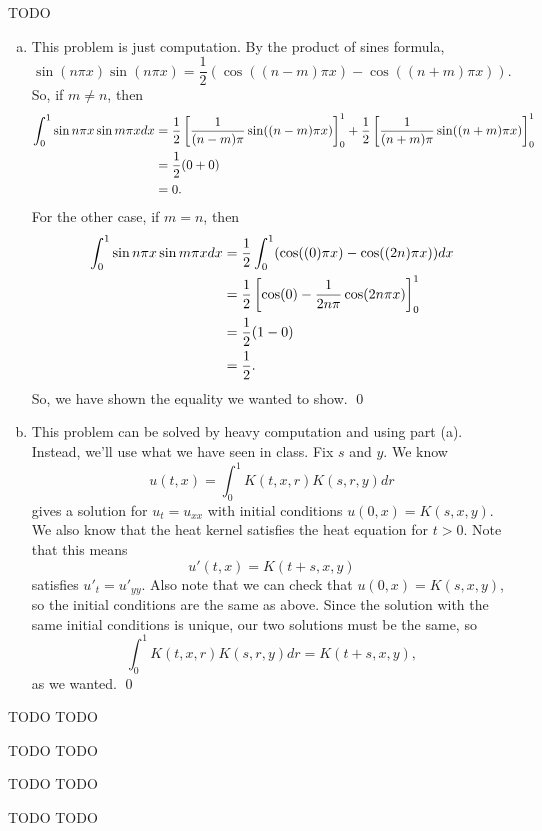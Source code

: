 \documentclass{article}
\begin{document}
\newpage
{} TODO \tri
\hop
\solution
\begin{enumerate}[(a)]
    \item This problem is just computation. By the product of sines formula, 
    \[\sin(n\pi x)\sin(n\pi x) = \frac{1}{2}(\cos((n-m)\pi x) - \cos((n+m)\pi x)).\]
    So, if $m \ne n$, then 
    \begin{align*}
        \int_0^1 \sin n\pi x \sin m \pi x dx&= \frac{1}{2}\sbr{\frac{1}{(n-m)\pi}\sin((n-m)\pi x)}_0^1+\frac{1}{2}\sbr{\frac{1}{(n+m)\pi}\sin((n+m)\pi x)}_0^1\\
        &= \frac{1}{2}(0+0)\\
        &= 0.
    \end{align*}
    For the other case, if $m = n$, then
    \begin{align*}
        \int_0^1 \sin n\pi x \sin m \pi x dx&=  \frac{1}{2}\int_0^1(\cos((0)\pi x) - \cos((2n)\pi x)) dx \\
        &= \frac{1}{2}\sbr{\cos(0) - \frac{1}{2n\pi}\cos(2n\pi x)}_0^1 \\
        &= \frac{1}{2}(1-0) \\
        &= \frac{1}{2}.
    \end{align*}
    So, we have shown the equality we wanted to show. \qed
    \item This problem can be solved by heavy computation and using part (a). Instead, we'll use what we have seen in class. Fix $s$ and $y$. We know 
    \[u(t,x)=\int_0^1K(t,x,r)K(s,r,y)dr\]
    gives a solution for $u_t = u_{xx}$ with initial conditions $u(0,x) = K(s,x,y)$. We also know that the heat kernel satisfies the heat equation for $t>0$. Note that this means
    \[u'(t,x) = K(t+s, x, y)\]
    satisfies $u'_t = u'_{yy}$. Also note that we can check that $u(0,x) = K(s,x,y)$, so the initial conditions are the same as above. Since the solution with the same initial conditions is unique, our two solutions must be the same, so 
    \[\int_0^1K(t,x,r)K(s,r,y)dr=K(t+s, x, y),\]
    as we wanted. \qed
\end{enumerate}


\newpage
{} TODO \tri
\hop
\solution
TODO


\newpage
{} TODO \tri
\hop
\solution
TODO


\newpage
{} TODO \tri
\hop
\solution
TODO


\newpage
{} TODO \tri
\hop
\solution
TODO
\end{document}
